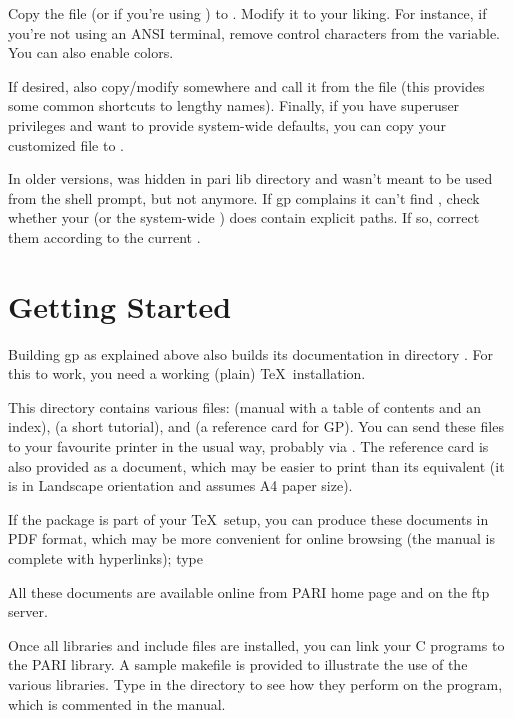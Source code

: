  Copy the file  (or
 if you're using ) to . Modify
it to your liking. For instance, if you're not using an ANSI terminal,
remove control characters from the  variable. You can also
enable colors. 

If desired, also copy/modify  somewhere and call it from
the  file (this provides some common shortcuts to lengthy names).
Finally, if you have superuser privileges and want to provide system-wide
defaults, you can copy your customized  file to .

In older versions,  was hidden in pari lib directory and wasn't
meant to be used from the shell prompt, but not anymore. If gp complains it
can't find , check whether your  (or the system-wide
) does contain explicit paths. If so, correct them according to the
current .

\section{Getting Started}

 Building gp as explained above also builds
its documentation in directory . For this to work, you need a
working (plain) \TeX\ installation.

This directory contains various  files:  (manual with
a table of contents and an index),  (a short tutorial), and
 (a reference card for GP). You can send these files to your
favourite printer in the usual way, probably via . The reference
card is also provided as a  document, which may be easier to
print than its  equivalent (it is in Landscape orientation and
assumes A4 paper size).

\noindent If the  package is part of your \TeX\ setup, you can
produce these documents in PDF format, which may be more convenient for
online browsing (the manual is complete with hyperlinks); type


\noindent All these documents are available online from PARI home page and on
the  ftp server.

 Once all libraries and include files are installed,
you can link your C programs to the PARI library. A sample makefile
 is provided to illustrate the use of the various
libraries. Type  in the  directory to see how
they perform on the  program, which is commented in the
manual.

